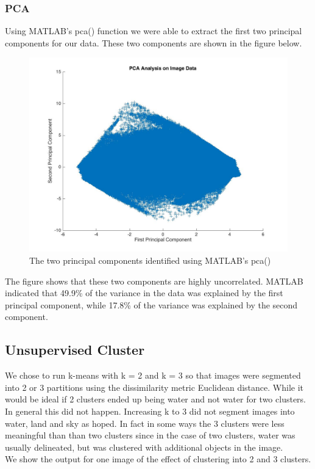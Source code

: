 \documentclass[12pt]{article}
\begin{document}
	\subsubsection{PCA}
	Using MATLAB's pca() function we were able to extract the first two principal components for our data. These two components are shown in the figure below.
	\begin{figure}[h]
		\centering
		\includegraphics[scale=.25]{./images/PCA_Analysis.jpg}
		\caption{The two principal components identified using MATLAB's pca()}
	\end{figure}
	The figure shows that these two components are highly uncorrelated. MATLAB indicated that 49.9\% of the variance in the data was explained by the first principal component, while 17.8\% of the variance was explained by the second component. 
	\subsection{Unsupervised Cluster}
	We chose to run k-means with k = 2 and k = 3 so that images were segmented into 2 or 3 partitions using the dissimilarity metric Euclidean distance. While it would be ideal if 2 clusters ended up being water and not water for two clusters. In general this did not happen.  Increasing k to 3 did not segment images into water, land and sky as hoped.  In fact in some ways the 3 clusters were less meaningful than than two clusters since in the case of two clusters, water was usually delineated, but was clustered with additional objects in the image.\\
	We show the output for one image of the effect of clustering into 2 and 3 clusters.\\
	
\end{document}
